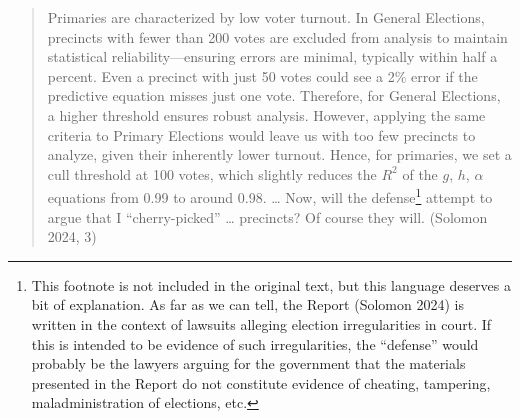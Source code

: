 \documentclass[12pt]{article}
\begin{document}
\begin{quote}
Primaries are characterized by low voter turnout. In General Elections, precincts with fewer than 200 votes are excluded from analysis to maintain statistical reliability---ensuring errors are minimal, typically within half a percent. Even a precinct with just 50 votes could see a 2\% error if the predictive equation misses just one vote. Therefore, for General Elections, a higher threshold ensures robust analysis. However, applying the same criteria to Primary Elections would leave us with too few precincts to analyze, given their inherently lower turnout. Hence, for primaries, we set a cull threshold at 100 votes, which slightly reduces the \(R^2\) of the \(g\), \(h\), \(\alpha\) equations from 0.99 to around 0.98. \ldots{} Now, will the defense\footnote{This footnote is not included in the original text, but this language deserves a bit of explanation. As far as we can tell, the Report (Solomon 2024) is written in the context of lawsuits alleging election irregularities in court. If this is intended to be evidence of such irregularities, the ``defense'' would probably be the lawyers arguing for the government that the materials presented in the Report do not constitute evidence of cheating, tampering, maladministration of elections, etc.} attempt to argue that I ``cherry-picked'' \ldots{} precincts? Of course they will. (Solomon 2024, 3)
\end{quote}

\begin{table}[!htbp] \centering \renewcommand*{\arraystretch}{1.1}\caption{Summary Statistics}
\end{table}
\end{document}
